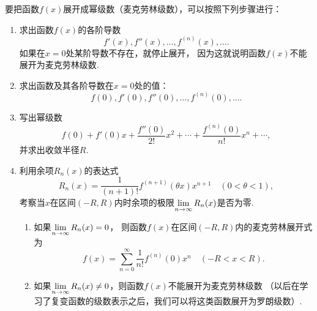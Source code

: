 要把函数\(f(x)\)展开成幂级数（麦克劳林级数），可以按照下列步骤进行：
\begin{enumerate}
\item 求出函数\(f(x)\)的各阶导数\[
f'(x),f''(x),\dotsc,f^{(n)}(x),\dotsc.
\]
如果在\(x=0\)处某阶导数不存在，就停止展开，
因为这就说明函数\(f(x)\)不能展开为麦克劳林级数.

\item 求出函数及其各阶导数在\(x=0\)处的值：\[
f(0),f'(0),f''(0),\dotsc,f^{(n)}(0),\dotsc.
\]

\item 写出幂级数\[
f(0) + f'(0) x + \frac{f''(0)}{2!} x^2 + \dotsb + \frac{f^{(n)}(0)}{n!} x^n + \dotsb,
\]
并求出收敛半径\(R\).

\item 利用余项\(R_n(x)\)的表达式\[
R_n(x) = \frac{1}{(n+1)!} f^{(n+1)}(\theta x) x^{n+1}
\quad(0 < \theta < 1),
\]
考察当\(x\)在区间\((-R,R)\)内时余项的极限\(\lim\limits_{n\to\infty} R_n(x)\)是否为零.
\begin{enumerate}
	\item 如果\(\lim\limits_{n\to\infty} R_n(x) = 0\)，
则函数\(f(x)\)在区间\((-R,R)\)内的麦克劳林展开式为
\[
f(x) = \sum\limits_{n=0}^\infty \frac{1}{n!} f^{(n)}(0) x^n
\quad(-R < x < R).
\]
	\item 如果\(\lim\limits_{n\to\infty} R_n(x) \neq 0\)，则函数\(f(x)\)不能展开为麦克劳林级数%
	（以后在学习了复变函数的级数表示之后，我们可以将这类函数展开为罗朗级数）.
\end{enumerate}
\end{enumerate}

